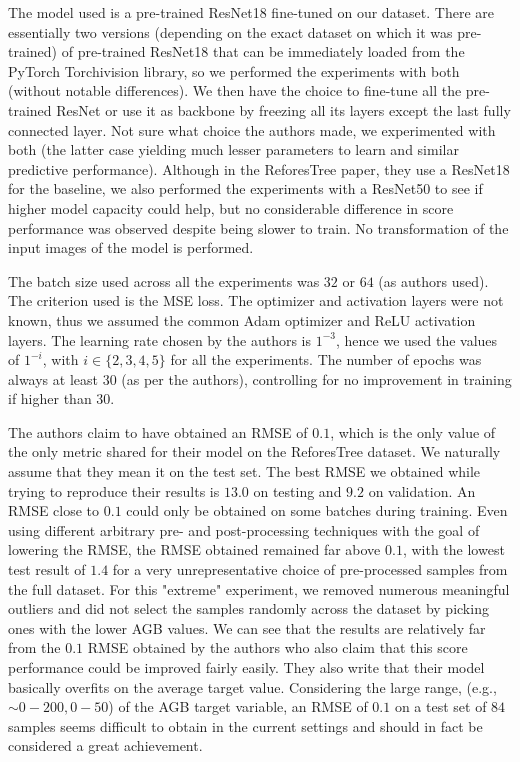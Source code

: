 \documentclass[10pt,twocolumn,letterpaper]{article}
\begin{document}
The model used is a pre-trained ResNet18 fine-tuned on our dataset. There are essentially two versions (depending on the exact dataset on which it was pre-trained) of pre-trained ResNet18 that can be immediately loaded from the PyTorch Torchivision library, so we performed the experiments with both (without notable differences). We then have the choice to fine-tune all the pre-trained ResNet or use it as backbone by freezing all its layers except the last fully connected layer. Not sure what choice the authors made, we experimented with both (the latter case yielding much lesser parameters to learn and similar predictive performance). Although in the ReforesTree paper, they use a ResNet18 for the baseline, we also performed the experiments with a ResNet50 to see if higher model capacity could help, but no considerable difference in score performance was observed despite being slower to train. No transformation of the input images of the model is performed.

The batch size used across all the experiments was $32$ or $64$ (as authors used). The criterion used is the MSE loss. The optimizer and activation layers were not known, thus we assumed the common Adam\cite{https://doi.org/10.48550/arxiv.1412.6980} optimizer and ReLU\cite{https://doi.org/10.48550/arxiv.1803.08375} activation layers. The learning rate chosen by the authors is $1^{-3}$, hence we used the values of $1^{-i}$, with $i \in \{2, 3, 4, 5\}$ for all the experiments. The number of epochs was always at least $30$ (as per the authors), controlling for no improvement in training if higher than $30$.  

The authors claim to have obtained an RMSE of $0.1$, which is the only value of the only metric shared for their model on the ReforesTree dataset. We naturally assume that they mean it on the test set. The best RMSE we obtained while trying to reproduce their results is $13.0$ on testing and $9.2$ on validation. An RMSE close to $0.1$ could only be obtained on some batches during training. Even using different arbitrary pre- and post-processing techniques with the goal of lowering the RMSE, the RMSE obtained remained far above $0.1$, with the lowest test result of $1.4$ for a very unrepresentative choice of pre-processed samples from the full dataset. For this "extreme" experiment, we removed numerous meaningful outliers and did not select the samples randomly across the dataset by picking ones with the lower AGB values. We can see that the results are relatively far from the $0.1$ RMSE obtained by the authors who also claim that this score performance could be improved fairly easily. They also write that their model basically overfits on the average target value. Considering the large range, (e.g., $\sim 0-200, 0-50$) of the AGB target variable, an RMSE of $0.1$ on a test set of $84$ samples seems difficult to obtain in the current settings and should in fact be considered a great achievement.
\end{document}
